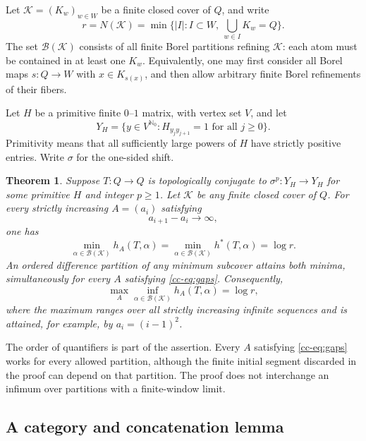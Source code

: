 \documentclass[11pt,reqno]{amsart}
\numberwithin{equation}{section}
\newtheorem{theorem}{Theorem}[section]
\theoremstyle{definition}
\newcommand{\Nzero}{\mathbb N_0}
\newcommand{\hpat}{h^{*}}
\newcommand{\K}{\mathcal K}
\begin{document}
Let $\K=(K_w)_{w\in W}$ be a finite closed cover of $Q$, and write
\[
 r=N(\K)=\min\{|I|:I\subset W,\ \bigcup_{w\in I}K_w=Q\}.
\]
The set $\mathcal B(\K)$ consists of all finite Borel partitions refining
$\K$: each atom must be contained in at least one $K_w$. Equivalently,
one may first consider all Borel maps $s:Q\to W$ with $x\in K_{s(x)}$,
and then allow arbitrary finite Borel refinements of their fibers.

Let $H$ be a primitive finite $0$--$1$ matrix, with vertex set $V$, and
let
\[
 Y_H=\{y\in V^{\Nzero}:H_{y_jy_{j+1}}=1\text{ for all }j\ge0\}.
\]
Primitivity means that all sufficiently large powers of $H$ have strictly
positive entries. Write $\sigma$ for the one-sided shift.

\begin{theorem}\label{cc-thm:cover}
Suppose $T:Q\to Q$ is topologically conjugate to $\sigma^p:Y_H\to Y_H$
for some primitive $H$ and integer $p\ge1$. Let $\K$ be any finite closed
cover of $Q$. For every strictly increasing $A=(a_i)$ satisfying
\begin{equation}\label{cc-eq:gaps}
 a_{i+1}-a_i\longrightarrow\infty,
\end{equation}
one has
\begin{equation}\label{cc-eq:coverformula}
 \min_{\alpha\in\mathcal B(\K)} h_A(T,\alpha)
 =\min_{\alpha\in\mathcal B(\K)}\hpat(T,\alpha)
 =\log r.
\end{equation}
An ordered difference partition of any minimum subcover attains both
minima, simultaneously for every $A$ satisfying \eqref{cc-eq:gaps}.
Consequently,
\begin{equation}\label{cc-eq:coverminimax}
 \max_A\inf_{\alpha\in\mathcal B(\K)}h_A(T,\alpha)=\log r,
\end{equation}
where the maximum ranges over all strictly increasing infinite sequences
and is attained, for example, by $a_i=(i-1)^2$.
\end{theorem}

The order of quantifiers is part of the assertion. Every $A$ satisfying
\eqref{cc-eq:gaps} works for every allowed partition, although the finite
initial segment discarded in the proof can depend on that partition.
The proof does not interchange an infimum over partitions with a
finite-window limit.

\subsection{A category and concatenation lemma}
\end{document}
